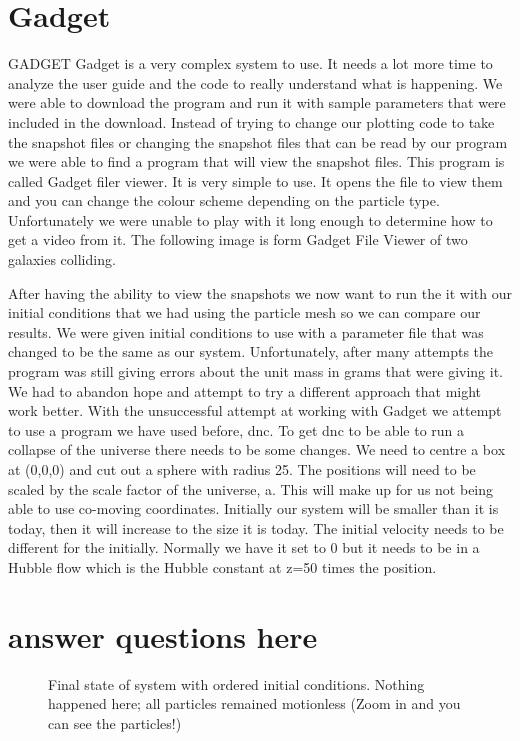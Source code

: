 \documentclass[10pt]{article}
\begin{document}
\section{Gadget}
GADGET
Gadget  is a very complex system to use. It needs a lot more time to analyze the user guide and the code to really understand what is happening. We were able to download the program and run it with sample parameters that were included in the download. Instead of trying to change our plotting code to take the snapshot files or changing the snapshot files that can be read by our program we were able to find a program that will view the snapshot files. This program is called Gadget filer viewer. It is very simple to use. It opens the file to view them and you can change the colour scheme depending on the particle type. Unfortunately we were unable to play with it long enough to determine how to get a video from it. The following image is form Gadget File Viewer of two galaxies colliding. 

After having the ability to view the snapshots we now want to run the it with our initial conditions that we had using the particle mesh so we can compare our results. We were given initial conditions to use with a parameter file that was changed to be the same as our system. Unfortunately, after many attempts the program was still giving errors about the unit mass in grams that were giving it. We had to abandon hope and attempt to try a different approach that might work better. With the unsuccessful attempt at working with Gadget we attempt to use a program we have used before, dnc. 
	To get dnc to be able to run a collapse of the universe there needs to be some changes. We need to centre a box at (0,0,0) and cut out a sphere with radius 25.  The positions will need to be scaled by the scale factor of the universe, a. This will make up for us not being able to use co-moving coordinates. Initially our system will be smaller than it is today, then it will increase to the size it is today. The initial velocity needs to be different for the initially. Normally we have it set to 0 but it needs to be in a Hubble flow which is the Hubble constant at z=50 times the position. 
\section{answer questions here}


\begin{figure}[htbp]
\centering

\caption{Final state of system with ordered initial conditions. Nothing happened here; all particles remained motionless (Zoom in and you can see the particles!)}
\label{fig:order}
\end{figure}
\end{document}
